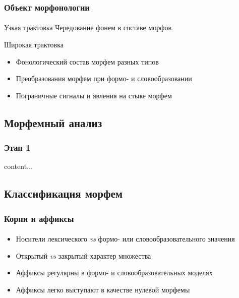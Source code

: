 \begin{frame}
    \frametitle{Объект морфонологии}
    \framesubtitle{\autocite{les}}

    \begin{alertblock}{Узкая трактовка}
        Чередование фонем в составе морфов
    \end{alertblock}

    \begin{exampleblock}{Широкая трактовка}
        \begin{itemize}
            \item Фонологический состав морфем разных типов
            \item Преобразования морфем при формо- и словообразовании
            \item Пограничные сигналы и явления на стыке морфем
        \end{itemize}
    \end{exampleblock}
\end{frame}

\subsection{Морфемный анализ}


\begin{frame}
    \frametitle{Этап 1}
    content...
\end{frame}


\subsection{Классификация морфем}


\begin{frame}
    \frametitle{Корни и аффиксы}
    \framesubtitle{\autocite[13--14]{zubova_menshikova:2014}}

    \begin{itemize}
        \item Носители лексического \textit{vs} формо- или словообразовательного значения
        \item Открытый \textit{vs} закрытый характер множества
        \item Аффиксы регулярны в формо- и словообразовательных моделях
        \item Аффиксы легко выступают в качестве нулевой морфемы
    \end{itemize}
\end{frame}

